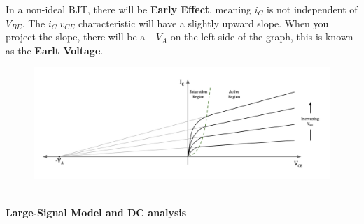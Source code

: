 In a non-ideal BJT, there will be \textbf{Early Effect}, meaning $i_C$ is not independent of $V_{BE}$. The $i_C\; v_{CE}$ characteristic will have a slightly upward slope. When you project the slope, there will be a $-V_A$ on the left side of the graph, this is known as the \textbf{Earlt Voltage}.
\begin{figure}[h]
    \centering
    \includegraphics[width=1\linewidth]{image/Earlyeffetc.png}
\end{figure}\\
\textbf{Large-Signal Model and DC analysis}
